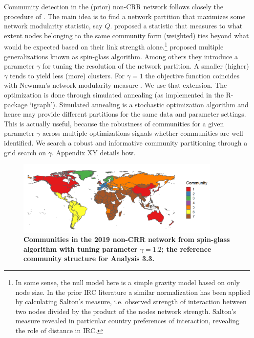Community detection in the (prior) non-CRR network follows closely the procedure of \cite{fitzgerald2021academia}. The main idea is to find a network partition that maximizes some network modularity statistic, say $Q$. \citet{newman2004analysis} proposed a statistic that measures to what extent nodes belonging to the same community form (weighted) ties beyond what would be expected based on their link strength alone.\footnote{In some sense, the null model here is a simple gravity model based on only node size. In the prior IRC literature a similar normalization has been applied by calculating Salton's measure, i.e. observed strength of interaction between two nodes divided by the product of the nodes network strength. Salton's measure revealed in particular country preferences of interaction, revealing the role of distance in IRC.} \cite{reichardt2006statistical} proposed multiple generalizations known as spin-glass algorithm. Among others they introduce a parameter $\gamma$ for tuning the resolution of the network partition. A smaller (higher) $\gamma$ tends to yield less (more) clusters. For $\gamma = 1$ the objective function coincides with Newman's network modularity measure \citep{newman2004analysis}. We use that extension. The optimization is done through simulated annealing (as implemented in the R-package `igraph'). Simulated annealing is a stochastic optimization algorithm and hence may provide different partitions for the same data and parameter settings. This is actually useful, because the robustness of communities for a given parameter $\gamma$ across multiple optimizations signals whether communities are well identified. We search a robust and informative community partitioning through a grid search on $\gamma$. Appendix XY details how. 


\begin{figure}[!h]
\includegraphics[width=0.9\textwidth]{1_chapter1/figures/Fig2.png} %
\caption{{\bf Communities in the 2019 non-CRR network from spin-glass algorithm with tuning parameter $\gamma=1.2$; the reference community structure for Analysis 3.3.}}
\label{fig:CommWorldmap} 
\end{figure}

